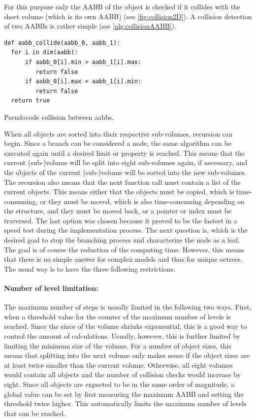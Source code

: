 For this purpose only the \ac{AABB} of the object is checked if it collides with the sheet volume (which is its own \ac{AABB}) (see \cref{fig:collision2D}).
A collision detection of two \ac{AABB}s is rather simple (see \cref{alg:collisionAABB}).
% 
\begin{lstfloat}[!tb]
\lstset{style=python}
\begin{lstlisting}[]
def aabb_collide(aabb_0, aabb_1):
  for i in dim(aabb):
      if aabb_0[i].min > aabb_1[i].max:
         return false
      if aabb_0[i].max < aabb_1[i].min:
         return false
  return true
\end{lstlisting}
\caption{Pseudocode collision between aabbs.}
\label{alg:collisionAABB}
\end{lstfloat}
% 
When all objects are sorted into their respective sub-volumes, recursion can begin.
Since a branch can be considered a node, the same algorithm can be executed again until a desired limit or property is reached.
This means that the current (sub-)volume will be split into eight sub-volumes again, if necessary, and the objects of the current (sub-)volume will be sorted into the new sub-volumes.
The recursion also means that the next function call must contain a list of the current objects.
This means either that the objects must be copied, which is time-consuming, or they must be moved, which is also time-consuming depending on the structure, and they must be moved back, or a pointer or index must be traversed.
The last option was chosen because it proved to be the fastest in a speed test during the implementation process.
The next question is, which is the desired goal to stop the branching process and characterize the node as a leaf.
\\[\baselineskip]
% 
The goal is of course the reduction of the computing time.
However, this means that there is no simple answer for complex models and thus for unique octrees.
The usual way is to have the three following restrictions.
% 
\paragraph{Number of level limitation:}
The maximum number of steps is usually limited in the following two ways.
First, when a threshold value for the counter of the maximum number of levels is reached.
Since the since of the volume shrinks exponential, this is a good way to control the amount of calculations.
Usually, however, this is further limited by limiting the minimum size of the volume.
For a number of object sizes, this means that splitting into the next volume only makes sense if the object sizes are at least twice smaller than the current volume.
Otherwise, all eight volumes would contain all objects and the number of collision checks would increase by eight.
Since all objects are expected to be in the same order of magnitude, a global value can be set by first measuring the maximum \ac{AABB} and setting the threshold twice higher.
This automatically limits the maximum number of levels that can be reached.
% 

